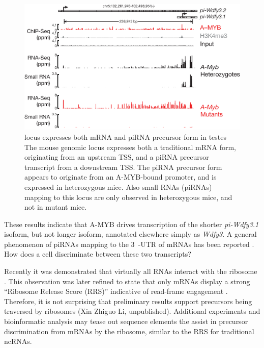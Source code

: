     \begin{figure} %
      \centering 
      \includegraphics{Figures/Discussion/pi-wdfy3.eps}
      \caption[\wdfy{} locus expresses both mRNA and piRNA precursor form in testes]
      {\wdfy{} locus expresses both mRNA and piRNA precursor form in testes\\[0.25cm]
        The mouse genomic locus \wdfy{} expresses both a traditional mRNA form, originating from an upstream TSS, and a piRNA precursor transcript from a downstream TSS. The piRNA precursor form appears to originate from an A-MYB-bound promoter, and is expressed in \amyb{} heterozygous mice. Also small RNAs (piRNAs) mapping to this locus are only observed in \amyb{} heterozygous mice, and not in \amyb{} mutant mice.
        }
      \label{Disc:fig:wdfy3}
      \end{figure}

    These results indicate that A-MYB drives transcription of the shorter \textit{pi-Wdfy3.1} isoform, but not longer isoform, annotated elsewhere simply as \textit{Wdfy3}. A general phenomenon of piRNAs mapping to the 3\textprime~-UTR of mRNAs has been reported \citep{Robine2009}. How does a cell discriminate between these two transcripts?

    Recently it was demonstrated that virtually all RNAs interact with the ribosome \citep{Ingolia2011}. This observation was later refined to state that only mRNAs display a strong ``Ribosome Release Score (RRS)'' indicative of read-frame engagement \citep{Guttman2013}. Therefore, it is not surprising that preliminary results support precursors being traversed by ribosomes (Xin Zhiguo Li, unpublished). Additional experiments and bioinformatic analysis may tease out sequence elements the assist in precursor discrimination from mRNAs by the ribosome, similar to the RRS for traditional ncRNAs.

